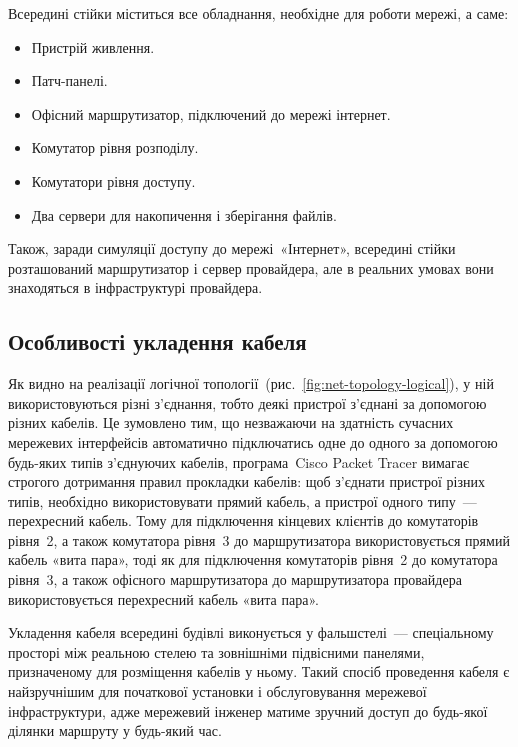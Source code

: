 \documentclass[
  ukrainian,
  simple,
  floatsection,
]{eskdnaukvd}
\begin{document}
      Всередині стійки міститься все обладнання, необхідне для роботи мережі, а саме:
      \begin{itemize}
        \item Пристрій живлення.
        \item Патч-панелі.
        \item Офісний маршрутизатор, підключений до мережі інтернет.
        \item Комутатор рівня розподілу.
        \item Комутатори рівня доступу.
        \item Два сервери для накопичення і зберігання файлів.
      \end{itemize}
      Також, заради симуляції доступу до мережі~«Інтернет», всередині стійки розташований маршрутизатор і сервер провайдера, але в реальних умовах вони знаходяться в інфраструктурі провайдера.

    \subsection{Особливості укладення кабеля}
      Як видно на реалізації логічної топології~(рис.~\ref{fig:net-topology-logical}), у ній використовуються різні з'єднання, тобто деякі пристрої з'єднані за допомогою різних кабелів. Це зумовлено тим, що незважаючи на здатність сучасних мережевих інтерфейсів автоматично підключатись одне до одного за допомогою будь-яких типів з'єднуючих кабелів, програма~\textenglish{Cisco Packet Tracer} вимагає строгого дотримання правил прокладки кабелів: щоб з'єднати пристрої різних типів, необхідно використовувати прямий кабель, а пристрої одного типу~— перехресний кабель. Тому для підключення кінцевих клієнтів до комутаторів рівня~2, а також комутатора рівня~3 до маршрутизатора використовується прямий кабель «вита пара», тоді як для підключення комутаторів рівня~2 до комутатора рівня~3, а також офісного маршрутизатора до маршрутизатора провайдера використовується перехресний кабель «вита пара».

      Укладення кабеля всередині будівлі виконується у фальшстелі~— спеціальному просторі між реальною стелею та зовнішніми підвісними панелями, призначеному для розміщення кабелів у ньому. Такий спосіб проведення кабеля є найзручнішим для початкової установки і обслуговування мережевої інфраструктури, адже мережевий інженер матиме зручний доступ до будь-якої ділянки маршруту у будь-який час.
\end{document}
